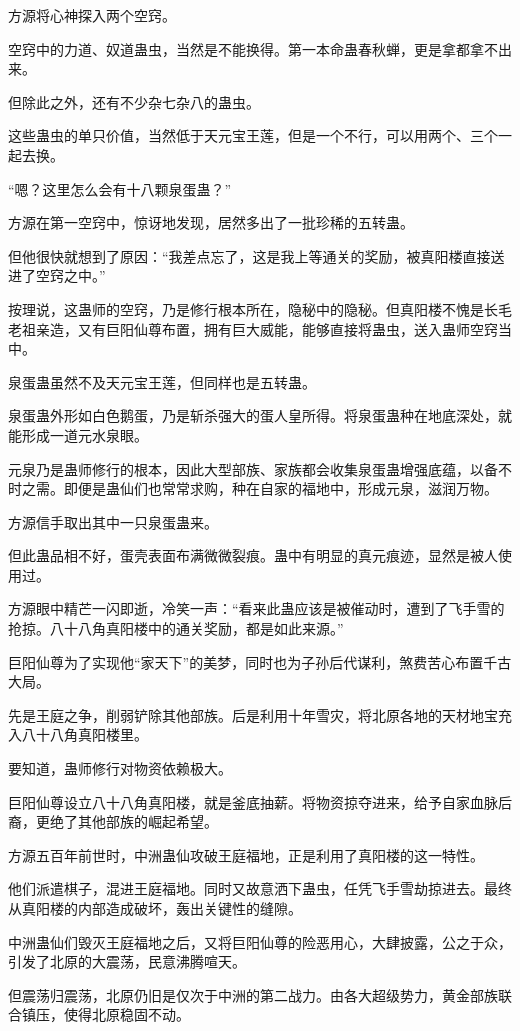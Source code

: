 \begin{this_body}
方源将心神探入两个空窍。

空窍中的力道、奴道蛊虫，当然是不能换得。第一本命蛊春秋蝉，更是拿都拿不出来。

但除此之外，还有不少杂七杂八的蛊虫。

这些蛊虫的单只价值，当然低于天元宝王莲，但是一个不行，可以用两个、三个一起去换。

“嗯？这里怎么会有十八颗泉蛋蛊？”

方源在第一空窍中，惊讶地发现，居然多出了一批珍稀的五转蛊。

但他很快就想到了原因：“我差点忘了，这是我上等通关的奖励，被真阳楼直接送进了空窍之中。”

按理说，这蛊师的空窍，乃是修行根本所在，隐秘中的隐秘。但真阳楼不愧是长毛老祖亲造，又有巨阳仙尊布置，拥有巨大威能，能够直接将蛊虫，送入蛊师空窍当中。

泉蛋蛊虽然不及天元宝王莲，但同样也是五转蛊。

泉蛋蛊外形如白色鹅蛋，乃是斩杀强大的蛋人皇所得。将泉蛋蛊种在地底深处，就能形成一道元水泉眼。

元泉乃是蛊师修行的根本，因此大型部族、家族都会收集泉蛋蛊增强底蕴，以备不时之需。即便是蛊仙们也常常求购，种在自家的福地中，形成元泉，滋润万物。

方源信手取出其中一只泉蛋蛊来。

但此蛊品相不好，蛋壳表面布满微微裂痕。蛊中有明显的真元痕迹，显然是被人使用过。

方源眼中精芒一闪即逝，冷笑一声：“看来此蛊应该是被催动时，遭到了飞手雪的抢掠。八十八角真阳楼中的通关奖励，都是如此来源。”

巨阳仙尊为了实现他“家天下”的美梦，同时也为子孙后代谋利，煞费苦心布置千古大局。

先是王庭之争，削弱铲除其他部族。后是利用十年雪灾，将北原各地的天材地宝充入八十八角真阳楼里。

要知道，蛊师修行对物资依赖极大。

巨阳仙尊设立八十八角真阳楼，就是釜底抽薪。将物资掠夺进来，给予自家血脉后裔，更绝了其他部族的崛起希望。

方源五百年前世时，中洲蛊仙攻破王庭福地，正是利用了真阳楼的这一特性。

他们派遣棋子，混进王庭福地。同时又故意洒下蛊虫，任凭飞手雪劫掠进去。最终从真阳楼的内部造成破坏，轰出关键性的缝隙。

中洲蛊仙们毁灭王庭福地之后，又将巨阳仙尊的险恶用心，大肆披露，公之于众，引发了北原的大震荡，民意沸腾喧天。

但震荡归震荡，北原仍旧是仅次于中洲的第二战力。由各大超级势力，黄金部族联合镇压，使得北原稳固不动。


\end{this_body}
